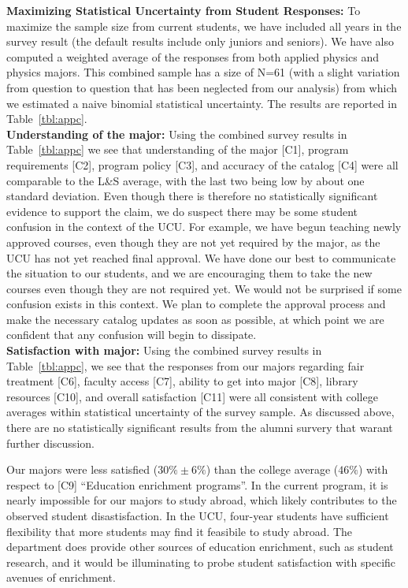 \documentclass[12pt]{article}
\begin{document}
\noindent
{\bf Maximizing Statistical Uncertainty from Student Responses:}
To maximize the sample size from current students, we have included
all years in the survey result (the default results include only
juniors and seniors).  We have also computed a weighted average of the
responses from both applied physics and physics majors.  This combined
sample has a size of N=61 (with a slight variation from question to
question that has been neglected from our analysis) from which we
estimated a naive binomial statistical uncertainty.  The results are
reported in Table~\ref{tbl:appc}.\\[3pt]

\noindent
{\bf Understanding of the major:} Using the combined survey results in
Table~\ref{tbl:appc} we see that understanding of the major [C1],
program requirements [C2], program policy [C3], and accuracy of the
catalog [C4] were all comparable to the L\&S average, with the last
two being low by about one standard deviation.  Even though there is
therefore no statistically significant evidence to support the claim,
we do suspect there may be some student confusion in the context of
the UCU.  For example, we have begun teaching newly approved courses,
even though they are not yet required by the major, as the UCU has not
yet reached final approval.  We have done our best to communicate the
situation to our students, and we are encouraging them to take the new
courses even though they are not required yet.  We would not be
surprised if some confusion exists in this context.  We plan to
complete the approval process and make the necessary catalog updates
as soon as possible, at which point we are confident that any
confusion will begin to dissipate.\\[3pt]

\noindent
{\bf Satisfaction with major:} Using the combined survey results in
Table~\ref{tbl:appc}, we see that the responses from our majors regarding
fair treatment [C6], faculty access [C7], ability to get into major
[C8], library resources [C10], and overall satisfaction [C11] were all
consistent with college averages within statistical uncertainty of the
survey sample.  As discussed above, there are no statistically
significant results from the alumni survery that warant further discussion.

Our majors were less satisfied ($30\% \pm 6\%$) than the college
average ($46\%$) with respect to [C9] ``Education enrichment
programs''.  In the current program, it is nearly impossible for our
majors to study abroad, which likely contributes to the observed
student disastisfaction.  In the UCU, four-year students have
sufficient flexibility that more students may find it feasibile to
study abroad.  The department does provide other sources of education
enrichment, such as student research, and it would be illuminating to
probe student satisfaction with specific avenues of enrichment.
\end{document}
